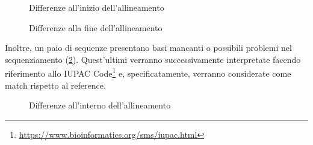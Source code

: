 \documentclass[11pt,italian]{article}
\begin{document}
\begin{figure}[H]
  \caption{Differenze all'inizio dell'allineamento}
  \label{fig:jalview-start}

  \caption{Differenze alla fine dell'allineamento}
  \label{fig:jalview-end}
\end{figure}

Inoltre, un paio di sequenze presentano basi mancanti o possibili problemi nel sequenziamento (\cref{fig:jalview-inner}).
Quest'ultimi verranno successivamente interpretate facendo riferimento allo IUPAC Code\footnote{\url{https://www.bioinformatics.org/sms/iupac.html}} e, specificatamente, verranno considerate come match rispetto al reference.

\begin{figure}[H]
  \caption{Differenze all'interno dell'allineamento}
  \label{fig:jalview-inner}
\end{figure}
\end{document}
